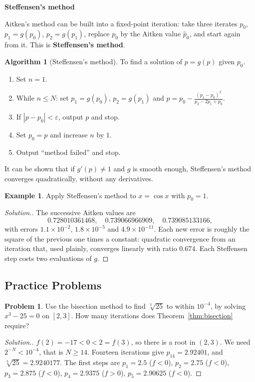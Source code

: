 \documentclass[11pt,a4paper]{article}
\numberwithin{equation}{section}
\theoremstyle{definition}
\newtheorem{exa}[thm]{Example}
\newtheorem{alg}[thm]{Algorithm}
\newtheorem{problemx}{Problem}[subsection]
\newenvironment{problem}{\begin{problemx}}{\end{problemx}}
\newenvironment{solution}
  {\renewcommand{\qedsymbol}{}\begin{proof}[\textit{Solution}.]}
  {\end{proof}}
\newcommand{\subhead}[1]{%
  \par\medskip\noindent\textbf{#1}\par\nobreak\smallskip}
\begin{document}
\subhead{Steffensen's method}
Aitken's method can be built into a fixed-point iteration: take three iterates $p_0$, $p_1 = g(p_0)$, $p_2 = g(p_1)$, replace $p_0$ by the
Aitken value $\hat p_0$, and start again from it. This is \textbf{Steffensen's method}.

\begin{alg}[Steffensen's method]
\label{alg:steffensen}
To find a solution of $p = g(p)$ given $p_0$.
\begin{enumerate}[label=Step \arabic*:,leftmargin=*]
\item Set $n = 1$.
\item While $n\leq N$: set $p_1 = g(p_0)$, $p_2 = g(p_1)$ and $p = p_0-\frac{(p_1-p_0)^2}{p_2-2p_1+p_0}$.
\item If $|p-p_0|<\varepsilon$, output $p$ and stop.
\item Set $p_0 = p$ and increase $n$ by $1$.
\item Output ``method failed'' and stop.
\end{enumerate}
\end{alg}

It can be shown that if $g'(p)\neq1$ and $g$ is smooth enough, Steffensen's method converges quadratically, without any derivatives.

\begin{exa}
\label{exa:steffensen}
Apply Steffensen's method to $x = \cos x$ with $p_0 = 1$.
\end{exa}

\begin{solution}
The successive Aitken values are
$$0.728010361468,\quad 0.739066966909,\quad 0.739085133166,$$
with errors $1.1\times10^{-2}$, $1.8\times10^{-5}$ and $4.9\times10^{-11}$. Each new error is roughly the square of the previous one times
a constant: quadratic convergence from an iteration that, used plainly, converges linearly with ratio $0.674$. Each Steffensen step costs two
evaluations of $g$.
\end{solution}


\subsection{Practice Problems}

\begin{problem}
Use the bisection method to find $\sqrt[3]{25}$ to within $10^{-4}$, by solving $x^3-25 = 0$ on $[2,3]$. How many iterations does
Theorem~\ref{thm:bisection} require?
\end{problem}
\begin{solution}
$f(2) = -17<0<2 = f(3)$, so there is a root in $(2,3)$. We need $2^{-N}<10^{-4}$, that is $N\geq14$. Fourteen iterations give
$p_{14} = 2.92401$, and $\sqrt[3]{25} = 2.9240177$. The first steps are $p_1 = 2.5$ ($f<0$), $p_2 = 2.75$ ($f<0$), $p_3 = 2.875$ ($f<0$),
$p_4 = 2.9375$ ($f>0$), $p_5 = 2.90625$ ($f<0$).
\end{solution}
\end{document}
